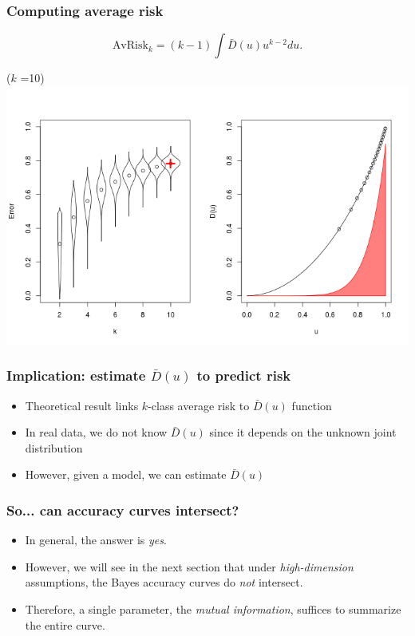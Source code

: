 \documentclass{beamer}
\begin{document}
\begin{frame}
\frametitle{Computing average risk}
\[
\text{AvRisk}_k = (k-1) \int \bar{D}(u) u^{k-2} du.
\]
\begin{center}
($k$ {\tiny =}\hspace{0.025in}10)
\includegraphics[scale = 0.4, clip=true, trim=0 0.1in 0 0.7in]{../extrapolation/rho_0_7_fmla10.png}
\end{center}
\end{frame}

\begin{frame}
\frametitle{Implication: estimate $\bar{D}(u)$ to predict risk}
\begin{itemize}
\item Theoretical result links $k$-class average risk to $\bar{D}(u)$ function
\item In real data, we do not know $\bar{D}(u)$ since it depends on the unknown joint distribution
\item However, given a model, we can estimate $\bar{D}(u)$
\end{itemize}
\end{frame}

\begin{frame}
\frametitle{So... can accuracy curves intersect?}
\begin{itemize}
\item In general, the answer is \emph{yes}.\pause
\item However, we will see in the next section that under \emph{high-dimension} assumptions, the Bayes accuracy curves do \emph{not} intersect.
\pause
\item Therefore, a single parameter, the \emph{mutual information}, suffices to summarize the entire curve.
\end{itemize}
\end{frame}
\end{document}
